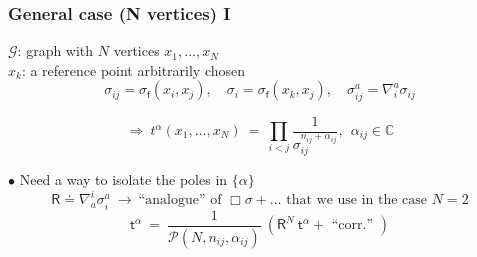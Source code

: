 \documentclass[9pt]{beamer}
\newcommand{\Gcal}{\mathcal{G}}
\newcommand{\Pcal}{\mathcal{P}}
\newcommand{\Cbb}{\mathbb{C}}
\newcommand{\Rsf}{\mathsf{R}}
\newcommand{\fsf}{\mathsf{f}}
\newcommand{\tsf}{\mathsf{t}}
\begin{document}
\begin{frame}
 
\frametitle{General case (N vertices) I}

\vfill

\begin{figure}
\end{figure}

$\Gcal$: graph with $N$ vertices $x_1, \dots, x_N$ \\
$x_k$: a reference point arbitrarily chosen
\begin{equation*}
\sigma_{ij} = \sigma_\fsf(x_i,x_j), \quad \sigma_{i} = \sigma_\fsf(x_k,x_j), \quad \sigma^a_{ij} = \nabla^a_i \sigma_{ij}
\end{equation*}

\vfill

\begin{equation*}
\Rightarrow \ t^\alpha(x_1, \dots, x_N) \ = \ \prod_{i<j} \frac{1}{\sigma_{ij}^{n_{ij}+\alpha_{ij}}} , \ \ \alpha_{ij} \in \Cbb
\end{equation*}

$\bullet$ Need a way to isolate the poles in $\{\alpha\}$
\vspace*{-5pt}
\begin{equation*}
\Rsf \doteq \nabla_a^i \sigma_i^a \ \to \ \mbox{``analogue'' of $\Box \sigma + \dots$ that we use in the case $N=2$}
\end{equation*}
\vspace*{-10pt}
\begin{equation*}
\tsf^\alpha \ = \ \frac{1}{\Pcal(N,n_{ij},\alpha_{ij})} \ \left( \Rsf^N \ \tsf^\alpha + \mbox{ ``corr.'' }  \right) 
\end{equation*}

\vfill

\end{frame}

\end{document}
